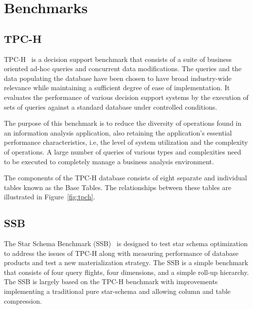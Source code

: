 \section{Benchmarks}
\label{sec:bench}

\subsection{TPC-H}

TPC-H~\cite{ref:tpch} is a decision support benchmark that consists of a suite of business oriented ad-hoc queries and concurrent data modifications. The queries and the data populating the database have been chosen to have broad industry-wide relevance while maintaining a sufficient degree of ease of implementation. It  evaluates the performance of various decision support systems by the execution of sets of queries against a standard database under controlled conditions.

The purpose of this benchmark is to reduce the diversity of operations found in an information analysis application, also retaining the application's essential performance characteristics, i.e, the level of system utilization and the complexity  of  operations.  A  large  number  of  queries  of  various  types  and  complexities  need  to  be  executed  to completely  manage  a  business  analysis  environment.

The  components  of  the  TPC-H  database  consists  of  eight  separate  and  individual  tables known as the Base Tables. The relationships between these tables are illustrated in Figure~\ref{fig:tpch}.




\subsection{SSB}

The Star Schema Benchmark (SSB)~\cite{ref:paper1} is designed to test star schema optimization to address the issues of TPC-H along with measuring performance of database  products  and test  a  new  materialization  strategy. The  SSB  is  a  simple  benchmark  that  consists  of  four  query flights,  four  dimensions,  and  a  simple  roll-up  hierarchy. The SSB is largely based on the TPC-H benchmark with improvements  implementing a traditional pure star-schema and allowing column and table compression.

